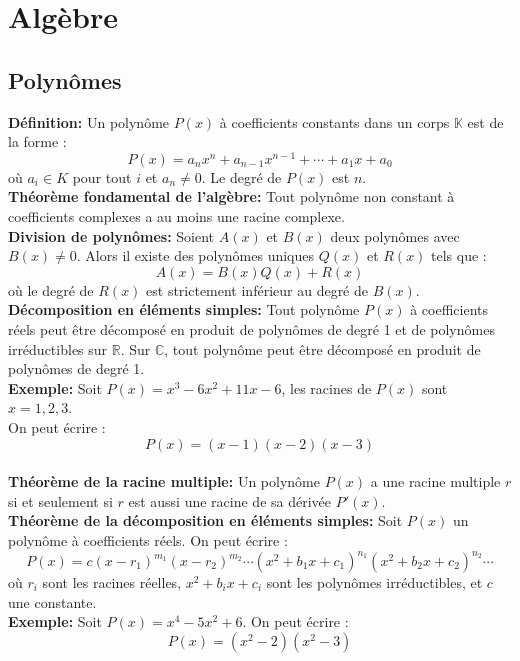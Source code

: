 \section{Algèbre}
\subsection{Polynômes}
\textbf{Définition:}
Un polynôme $P(x)$ à coefficients constants dans un corps $\mathbb{K}$ est de la forme :
\[
P(x) = a_n x^n + a_{n-1} x^{n-1} + \cdots + a_1 x + a_0
\]
où $a_i \in K$ pour tout $i$ et $a_n \neq 0$. Le degré de $P(x)$ est $n$. \\


\textbf{Théorème fondamental de l'algèbre:}
Tout polynôme non constant à coefficients complexes a au moins une racine complexe. \\


\textbf{Division de polynômes:}
Soient $A(x)$ et $B(x)$ deux polynômes avec $B(x) \neq 0$. Alors il existe des polynômes uniques $Q(x)$ et $R(x)$ tels que :
\[
A(x) = B(x) Q(x) + R(x)
\]
où le degré de $R(x)$ est strictement inférieur au degré de $B(x)$. \\


\textbf{Décomposition en éléments simples:}
Tout polynôme $P(x)$ à coefficients réels peut être décomposé en produit de polynômes de degré 1 et de polynômes irréductibles sur $\mathbb{R}$. Sur $\mathbb{C}$, tout polynôme peut être décomposé en produit de polynômes de degré 1. \\

\textbf{Exemple:}
Soit $P(x) = x^3 - 6x^2 + 11x - 6$, les racines de $P(x)$ sont $x = 1, 2, 3$. \\
On peut écrire :
\[
P(x) = (x - 1)(x - 2)(x - 3)
\] \\

\textbf{Théorème de la racine multiple:}
Un polynôme $P(x)$ a une racine multiple $r$ si et seulement si $r$ est aussi une racine de sa dérivée $P'(x)$. \\


\textbf{Théorème de la décomposition en éléments simples:}
Soit $P(x)$ un polynôme à coefficients réels. On peut écrire :
\[
P(x) = c (x - r_1)^{m_1} (x - r_2)^{m_2} \cdots (x^2 + b_1 x + c_1)^{n_1} (x^2 + b_2 x + c_2)^{n_2} \cdots
\]
où $r_i$ sont les racines réelles, $x^2 + b_i x + c_i$ sont les polynômes irréductibles, et $c$ une constante. \\


\textbf{Exemple:}
Soit $P(x) = x^4 - 5x^2 + 6$. On peut écrire :
\[
P(x) = (x^2 - 2)(x^2 - 3)
\]


